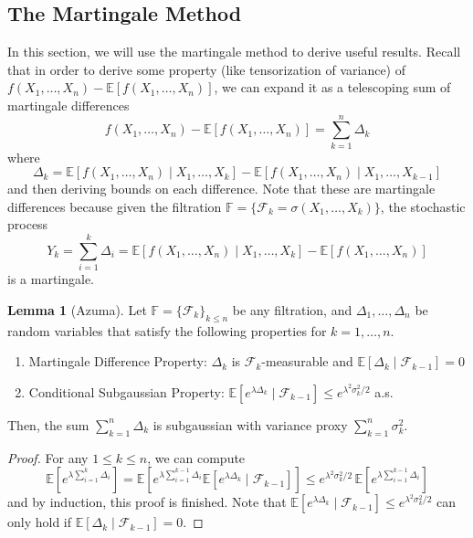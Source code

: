 \documentclass{article}
\theoremstyle{definition}
\newtheorem{lemma}[theorem]{Lemma}
\theoremstyle{remark}
\theoremstyle{definition}
\begin{document}
  \subsection{The Martingale Method}

  In this section, we will use the martingale method to derive useful results. Recall that in order to derive some property (like tensorization of variance) of $f(X_1, \ldots, X_n) - \mathbb{E}[f(X_1, \ldots, X_n)]$, we can expand it as a telescoping sum of martingale differences 
  \[f(X_1, \ldots, X_n) - \mathbb{E}[f(X_1, \ldots, X_n)] = \sum_{k=1}^n \Delta_k\]
  where 
  \[\Delta_k = \mathbb{E}[f(X_1, \ldots, X_n) \mid X_1, \ldots, X_k] - \mathbb{E}[f(X_1, \ldots, X_n) \mid X_1, \ldots, X_{k-1}]\]
  and then deriving bounds on each difference. Note that these are martingale differences because given the filtration $\mathbb{F} = \{\mathcal{F}_k = \sigma(X_1, \ldots, X_k)\}$, the stochastic process
  \[Y_k = \sum_{i=1}^k \Delta_i = \mathbb{E}[f(X_1, \ldots, X_n) \mid X_1, \ldots, X_k] - \mathbb{E}[f(X_1, \ldots, X_n)]\]
  is a martingale. 

  \begin{lemma}[Azuma]
  Let $\mathbb{F} = \{\mathcal{F}_k\}_{k \leq n}$ be any filtration, and $\Delta_1, \ldots, \Delta_n$ be random variables that satisfy the following properties for $k = 1, \ldots, n$. 
  \begin{enumerate}
      \item Martingale Difference Property: $\Delta_k$ is $\mathcal{F}_k$-measurable and $\mathbb{E}[\Delta_k \mid \mathcal{F}_{k-1}] = 0$ 
      \item Conditional Subgaussian Property: $\mathbb{E}[e^{\lambda \Delta_k} \mid \mathcal{F}_{k-1}] \leq e^{\lambda^2 \sigma^2_k / 2}$ a.s. 
  \end{enumerate}
  Then, the sum $\sum_{k=1}^n \Delta_k$ is subgaussian with variance proxy $\sum_{k=1}^n \sigma_k^2$. 
  \end{lemma}
  \begin{proof}
  For any $1 \leq k \leq n$, we can compute 
  \[\mathbb{E}[ e^{\lambda \sum_{i=1}^k \Delta_i} ] = \mathbb{E}[e^{\lambda \sum_{i=1}^{k-1} \Delta_i} \mathbb{E}[e^{\lambda \Delta_k} \mid \mathcal{F}_{k-1}]] \leq e^{\lambda^2 \sigma_k^2 / 2} \, \mathbb{E}[e^{\lambda \sum_{i=1}^{k-1} \Delta_i}]\]
  and by induction, this proof is finished. Note that $\mathbb{E}[e^{\lambda \Delta_k} \mid \mathcal{F}_{k-1}] \leq e^{\lambda^2 \sigma^2_k / 2}$ can only hold if $\mathbb{E}[\Delta_k \mid \mathcal{F}_{k-1}] = 0$. 
  \end{proof}
\end{document}
